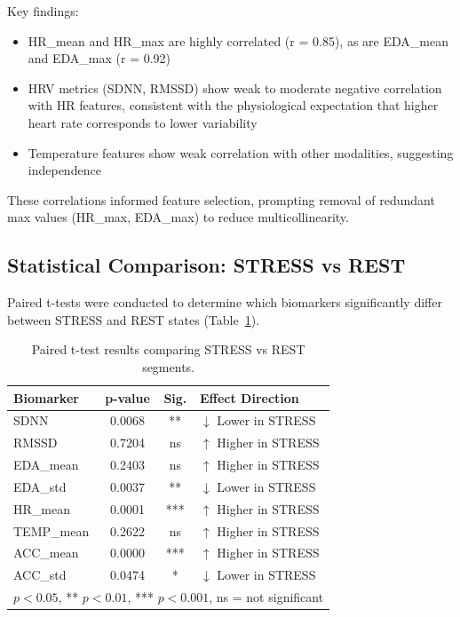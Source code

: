 \documentclass[12pt,letterpaper]{article}
\begin{document}
Key findings:
\begin{itemize}
    \item HR\_mean and HR\_max are highly correlated (r = 0.85), as are EDA\_mean and EDA\_max (r = 0.92)
    \item HRV metrics (SDNN, RMSSD) show weak to moderate negative correlation with HR features, consistent with the physiological expectation that higher heart rate corresponds to lower variability
    \item Temperature features show weak correlation with other modalities, suggesting independence
\end{itemize}

These correlations informed feature selection, prompting removal of redundant max values (HR\_max, EDA\_max) to reduce multicollinearity.

\subsection{Statistical Comparison: STRESS vs REST}

Paired t-tests were conducted to determine which biomarkers significantly differ between STRESS and REST states (Table~\ref{tab:ttests}).

\begin{table}[H]
\centering
\caption{Paired t-test results comparing STRESS vs REST segments.}
\label{tab:ttests}
\begin{tabular}{lccl}
\toprule
\textbf{Biomarker} & \textbf{p-value} & \textbf{Sig.} & \textbf{Effect Direction} \\
\midrule
SDNN          & 0.0068 & **  & $\downarrow$ Lower in STRESS \\
RMSSD         & 0.7204 & ns  & $\uparrow$ Higher in STRESS \\
EDA\_mean     & 0.2403 & ns  & $\uparrow$ Higher in STRESS \\
EDA\_std      & 0.0037 & **  & $\downarrow$ Lower in STRESS \\
HR\_mean      & 0.0001 & *** & $\uparrow$ Higher in STRESS \\
TEMP\_mean    & 0.2622 & ns  & $\uparrow$ Higher in STRESS \\
ACC\_mean     & 0.0000 & *** & $\uparrow$ Higher in STRESS \\
ACC\_std      & 0.0474 & *   & $\downarrow$ Lower in STRESS \\
\bottomrule
\multicolumn{4}{l}{\small * $p < 0.05$, ** $p < 0.01$, *** $p < 0.001$, ns = not significant}
\end{tabular}
\end{table}
\end{document}
